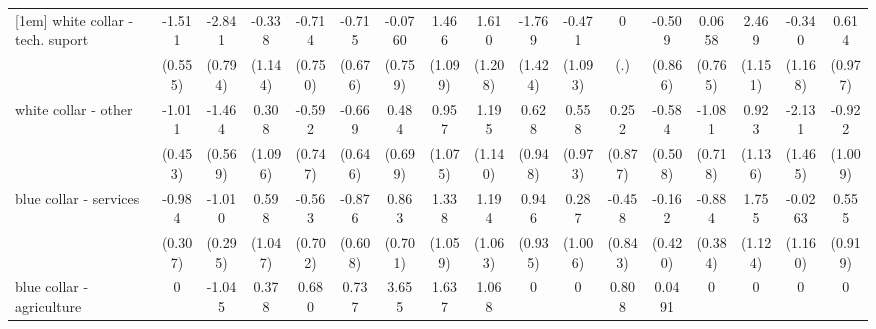 {\begin{tabular}{l*{16}{c}}
[1em]
white collar - tech. suport&      -1.511\sym{**} &      -2.841\sym{***}&      -0.338         &      -0.714         &      -0.715         &     -0.0760         &       1.466         &       1.610         &      -1.769         &      -0.471         &           0         &      -0.509         &      0.0658         &       2.469\sym{*}  &      -0.340         &       0.614         \\
                    &     (0.555)         &     (0.794)         &     (1.144)         &     (0.750)         &     (0.676)         &     (0.759)         &     (1.099)         &     (1.208)         &     (1.424)         &     (1.093)         &         (.)         &     (0.866)         &     (0.765)         &     (1.151)         &     (1.168)         &     (0.977)         \\
[1em]
white collar - other&      -1.011\sym{*}  &      -1.464\sym{*}  &       0.308         &      -0.592         &      -0.669         &       0.484         &       0.957         &       1.195         &       0.628         &       0.558         &       0.252         &      -0.584         &      -1.081         &       0.923         &      -2.131         &      -0.922         \\
                    &     (0.453)         &     (0.569)         &     (1.096)         &     (0.747)         &     (0.646)         &     (0.699)         &     (1.075)         &     (1.140)         &     (0.948)         &     (0.973)         &     (0.877)         &     (0.508)         &     (0.718)         &     (1.136)         &     (1.465)         &     (1.009)         \\
[1em]
blue collar - services&      -0.984\sym{**} &      -1.010\sym{***}&       0.598         &      -0.563         &      -0.876         &       0.863         &       1.338         &       1.194         &       0.946         &       0.287         &      -0.458         &      -0.162         &      -0.884\sym{*}  &       1.755         &     -0.0263         &       0.555         \\
                    &     (0.307)         &     (0.295)         &     (1.047)         &     (0.702)         &     (0.608)         &     (0.701)         &     (1.059)         &     (1.063)         &     (0.935)         &     (1.006)         &     (0.843)         &     (0.420)         &     (0.384)         &     (1.124)         &     (1.160)         &     (0.919)         \\
[1em]
blue collar - agriculture&           0         &      -1.045         &       0.378         &       0.680         &       0.737         &       3.655\sym{**} &       1.637         &       1.068         &           0         &           0         &       0.808         &      0.0491         &           0         &           0         &           0         &           0         \\

\end{tabular}}
